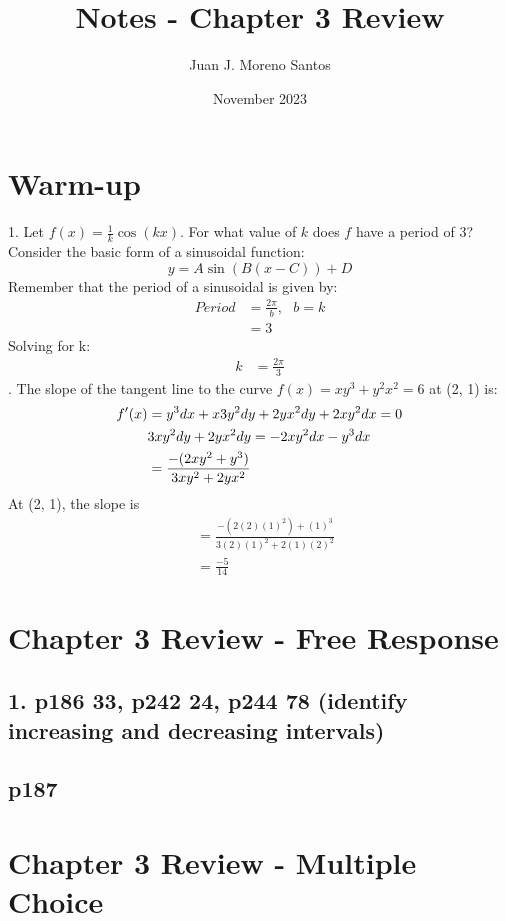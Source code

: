 \documentclass[11pt]{article}
\newcommand*{\next}{\noindent}
\newcommand*{\set}{\setcounter{equation}{0}}
\begin{document}
\title{Notes - Chapter 3 Review}
\author{Juan J. Moreno Santos}
\date{November 2023}

\maketitle

\section{Warm-up}
1. Let $f(x)=\frac{1}{k}\cos (kx)$. For what value of $k$ does $f$ have a period of 3?\\
Consider the basic form of a sinusoidal function:
\[y=A\sin (B(x-C))+D\]
Remember that the period of a sinusoidal is given by:
\begin{align}
    Period&=\frac{2\pi}{b},\,\,\,\, b=k\\
    &=3
\end{align}
Solving for k:
\begin{align}
    k&=\frac{2\pi}{3}
\end{align}
\next
2. The slope of the tangent line to the curve $f(x)=xy^3+y^2x^2=6$ at (2, 1) is:
\begin{align}
    \set
    f'(x)&=y^3dx+x3y^2dy+2yx^2dy+2xy^2dx=0\\
    &3xy^2dy+2yx^2dy=-2xy^2dx-y^3dx\\
    &=\frac{-(2xy^2+y^3)}{3xy^2+2yx^2}
\end{align}
At (2, 1), the slope is
\begin{align}
    &=\frac{-(2(2)(1)^2)+(1)^3}{3(2)(1)^2+2(1)(2)^2}\\
    &=\frac{-5}{14}
\end{align}


\section{Chapter 3 Review - Free Response}
\subsection{1. p186 33, p242 24, p244 78 (identify increasing and decreasing intervals)}




\subsection{p187 }
\section{Chapter 3 Review - Multiple Choice}
\end{document}
